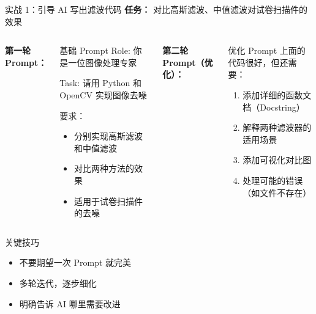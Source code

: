 
\begin{frame}{实战 1：引导 AI 写出滤波代码}
	\textbf{任务：} 对比高斯滤波、中值滤波对试卷扫描件的效果

	\vspace{0.3cm}

	\begin{columns}
		\textbf{第一轮 Prompt：}

		\begin{exampleblock}{基础 Prompt}
			\small
			Role: 你是一位图像处理专家

			Task: 请用 Python 和 OpenCV 实现图像去噪

			要求：
			\begin{itemize}
				\item 分别实现高斯滤波和中值滤波
				\item 对比两种方法的效果
				\item 适用于试卷扫描件的去噪
			\end{itemize}
		\end{exampleblock}

		\textbf{第二轮 Prompt（优化）：}

		\begin{exampleblock}{优化 Prompt}
			\small
			上面的代码很好，但还需要：
			\begin{enumerate}
				\item 添加详细的函数文档（Docstring）
				\item 解释两种滤波器的适用场景
				\item 添加可视化对比图
				\item 处理可能的错误（如文件不存在）
			\end{enumerate}
		\end{exampleblock}
	\end{columns}

	\vspace{0.3cm}

	\begin{block}{关键技巧}
		\begin{itemize}
			\item 不要期望一次 Prompt 就完美
			\item 多轮迭代，逐步细化
			\item 明确告诉 AI 哪里需要改进
		\end{itemize}
	\end{block}
\end{frame}

